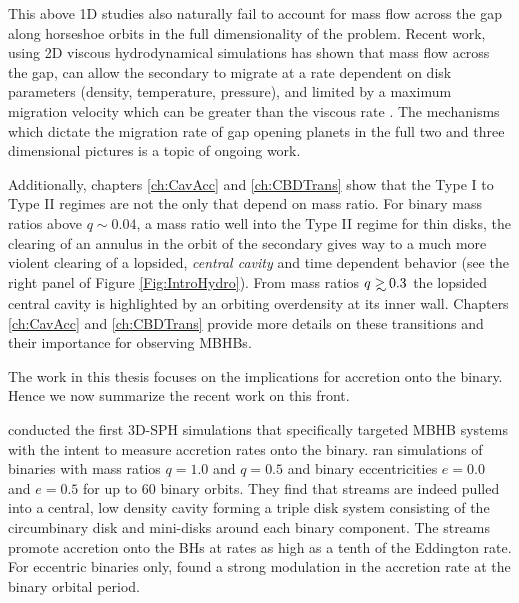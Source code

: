 This above 1D studies also naturally fail to account for mass flow across the
gap along horseshoe orbits in the full dimensionality of the problem. Recent
work, using 2D viscous hydrodynamical simulations has shown that mass flow
across the gap, can allow the secondary to migrate at a rate dependent on disk
parameters (density, temperature, pressure), and limited by a maximum migration
velocity which can be greater than the viscous rate \citep{Edgar:2008,
DuffellFTV:2014, DurmannKley:2015}. The mechanisms which dictate the migration
rate of gap opening planets in the full two and three dimensional pictures is
a topic of ongoing work.



Additionally, chapters \ref{ch:CavAcc} \citep{DHM:2013:MNRAS} and \ref{ch:CBDTrans}
\citep{D'Orazio:CBDTrans:2016} show that the Type I to Type II regimes are not
the only that depend on mass ratio. For binary mass ratios above $q\sim0.04$,
a mass ratio well into the Type II regime for thin disks, the clearing of an
annulus in the orbit of the secondary gives way to a much more violent
clearing of a lopsided, \textit{central cavity} and time dependent behavior (see the right panel of Figure \ref{Fig:IntroHydro}).
From mass ratios $q \gsim 0.3$ the lopsided central cavity is highlighted by an
orbiting overdensity at its inner wall. Chapters \ref{ch:CavAcc} and
\ref{ch:CBDTrans} provide more details on these transitions and their
importance for observing MBHBs.




The work in this thesis focuses on the implications for accretion onto the binary. Hence we now summarize the recent work on this front.


\cite{Hayasaki:2007} conducted the first 3D-SPH simulations that specifically
targeted MBHB systems with the intent to measure accretion rates onto the
binary. \cite{Hayasaki:2007} ran simulations of binaries with mass ratios
$q=1.0$ and $q=0.5$ and binary eccentricities $e=0.0$ and $e=0.5$ for up to 60
binary orbits. They find that streams are indeed pulled into a central, low
density cavity forming a triple disk system \citep{Hayasaki+2008} consisting of
the circumbinary disk and mini-disks around each binary component. The streams
promote accretion onto the BHs at rates as high as a tenth of the Eddington
rate. For eccentric binaries only, \cite{Hayasaki:2007} found a strong modulation in
the accretion rate at the binary orbital period. 

